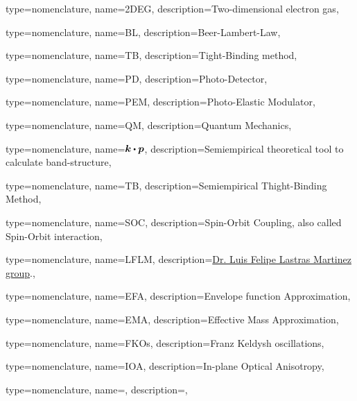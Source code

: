 {type={nomenclature},
name={2DEG},
description={Two-dimensional electron gas},
}

{type={nomenclature},
name={BL},
description={Beer-Lambert-Law},
}

{type={nomenclature},
name={TB},
description={Tight-Binding method},
}

{type={nomenclature},
name={PD},
description={Photo-Detector},
}

{type={nomenclature},
name={PEM},
description={Photo-Elastic Modulator},
}

{type={nomenclature},
name={QM},
description={Quantum Mechanics},
}

{type={nomenclature},
name={$\boldsymbol{k}\bigcdot \boldsymbol{p}$},
description={Semiempirical theoretical tool to calculate band-structure},
}


{type={nomenclature},
name={TB},
description={Semiempirical Thight-Binding Method},
}


{type={nomenclature},
name={SOC},
description={Spin-Orbit Coupling, also called Spin-Orbit interaction},
}

{type={nomenclature},
name={LFLM},
description={\href{https://github.com/lflm-spectra-labs-iico}{Dr. Luis Felipe Lastras Martinez group}.},
}

{type={nomenclature},
name={EFA},
description={Envelope function Approximation},
}

{type={nomenclature},
name={EMA},
description={Effective Mass Approximation},
}

{type={nomenclature},
name={FKOs},
description={Franz Keldysh oscillations},
}

{type={nomenclature},
name={IOA},
description={In-plane Optical Anisotropy},
}




\newglossaryentry{}
{type={nomenclature},
name={},
description={},
}

\renewcommand{\glsnamefont}[1]{\textcolor{black}{\textbf{#1}}}
\printunsrtglossary[type=nomenclature,style=long3col]
\printunsrtglossary[type=abbreviations,title={List of codes and packages}]
\printunsrtglossary[type=symbols,]

